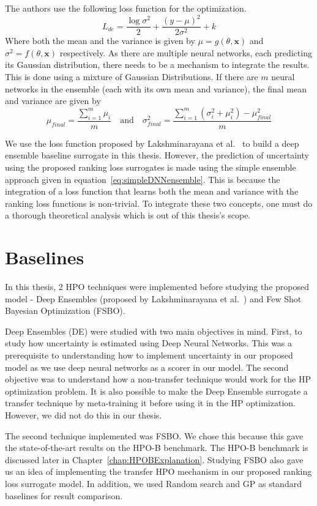 \documentclass[12pt, twoside, ngerman]{report}
\begin{document}
The authors use the following loss function for the optimization.
$$
L_{de} = \frac{\log \sigma^2 }{2} + \frac{(y - \mu)^2}{2\sigma^2} + k
$$
Where both the mean and the variance is given by $\mu = g(\theta, \textbf{x})$  and $\sigma^2 = f(\theta,  \textbf{x})$ respectively.
As there are multiple neural networks, each predicting its Gaussian distribution,
there needs to be a mechanism to integrate the results.
This is done using a mixture of Gaussian Distributions.
If there are $m$ neural networks in the ensemble (each with its own mean and variance), the final mean and variance are given by
$$
\mu_{final} =  \frac{\sum\limits_{i=1}^{m} \mu_i}{m} \quad \textrm{and} \quad \sigma_{final}^2 = \frac{\sum\limits_{i=1}^{m} (\sigma_i^2 + \mu_i^2) - \mu_{final}^2}{m}
$$

We use the loss function proposed by Lakshminarayana et al.~\cite{DeepEnsemblePaper} to build a deep ensemble baseline surrogate in this thesis. 
However, the prediction of uncertainty using the proposed ranking loss surrogates is made using the simple ensemble approach given in equation~\ref{eq:simpleDNNensemble}.
This is because the integration of a loss function that learns both the mean and variance with the ranking loss functions is non-trivial.
To integrate these two concepts, one must do a thorough theoretical analysis which is out of this thesis's scope.

\section{Baselines}

In this thesis,  2 HPO techniques were implemented before studying the proposed model - Deep Ensembles (proposed by Lakshminarayana et al.~\cite{DeepEnsemblePaper}) and Few Shot Bayesian Optimization (FSBO).

Deep Ensembles (DE) were studied with two main objectives in mind.
First, to study how uncertainty is estimated using Deep Neural Networks.
This was a prerequisite to understanding how to implement uncertainty in our proposed model as we use deep neural networks as a scorer in our model. 
The second objective was to understand how a non-transfer technique would work for the HP optimization problem.
It is also possible to make the Deep Ensemble surrogate a transfer technique by meta-training it before using it in the HP optimization. However, we did not do this in our thesis.

The second technique implemented was FSBO.
We chose this because this gave the state-of-the-art results on the HPO-B benchmark. The HPO-B benchmark is discussed later in Chapter~\ref{chap:HPOBExplanation}.
Studying FSBO also gave us an idea of implementing the transfer HPO mechanism in our proposed ranking loss surrogate model.
In addition, we used Random search and GP as standard baselines for result comparison.
\end{document}
